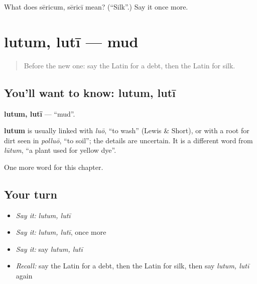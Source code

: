 \begin{tcolorbox}[breakable,colback=teal!4,colframe=teal!35!black,title={Before you move on}]
What does sēricum, sēricī mean? (\textquotedblleft{}Silk\textquotedblright{}.) Say it once more.
\end{tcolorbox}
\section[lutum, lutī]{lutum, lutī — mud}

\label{lesson:LA-C275-lutum}



\begin{quote}
Before the new one: say the Latin for a debt, then the Latin for silk.
\end{quote}

\subsection*{You'll want to know: lutum, lutī}
\textbf{lutum, lutī} — \textquotedblleft{}mud\textquotedblright{}.

\begin{cousinweb}
\textbf{lutum} is usually linked with \emph{luō}, \textquotedblleft{}to wash\textquotedblright{} (Lewis \& Short), or with a root for dirt seen in \emph{polluō}, \textquotedblleft{}to soil\textquotedblright{}; the details are uncertain. It is a different word from \emph{lūtum}, \textquotedblleft{}a plant used for yellow dye\textquotedblright{}.
\end{cousinweb}

\begin{grammarlens}[title={What you've built}]
One more word for this chapter.
\end{grammarlens}

\subsection*{Your turn}
\begin{itemize}
\raggedright
  \item \emph{Say it:} \emph{lutum, lutī}
  \item \emph{Say it:} \emph{lutum, lutī}, once more
  \item \emph{Say it:} say \emph{lutum, lutī}
  \item \emph{Recall:} say the Latin for a debt, then the Latin for silk, then say \emph{lutum, lutī} again
\end{itemize}

